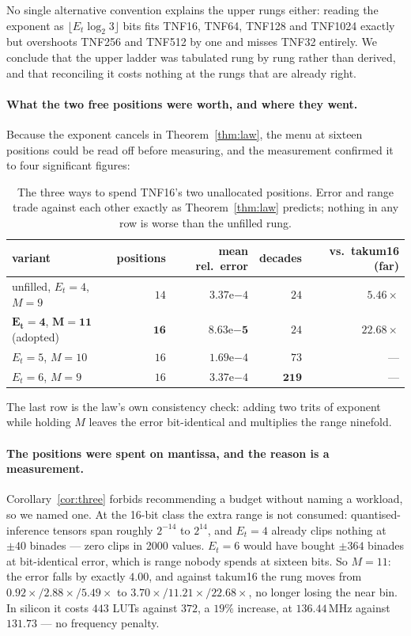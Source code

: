 \documentclass[11pt]{article}
\theoremstyle{definition}
\begin{document}
No single alternative convention explains the upper rungs either: reading the
exponent as $\lfloor E_t\log_2 3\rfloor$ bits fits TNF16, TNF64, TNF128 and
TNF1024 exactly but overshoots TNF256 and TNF512 by one and misses TNF32
entirely. We conclude that the upper ladder was tabulated rung by rung rather than
derived, and that reconciling it costs nothing at the rungs that are already
right.

\paragraph{What the two free positions were worth, and where they went.} Because
the exponent cancels in Theorem~\ref{thm:law}, the menu at sixteen positions could
be read off before measuring, and the measurement confirmed it to four significant
figures:

\begin{table}[t]\centering
\caption{The three ways to spend TNF16's two unallocated positions. Error and
range trade against each other exactly as Theorem~\ref{thm:law} predicts; nothing
in any row is worse than the unfilled rung.}
\label{tab:tnf16-fill}
\begin{tabular}{lrrrr}
\toprule
variant & positions & mean rel.\ error & decades & vs.\ takum16 (far) \\
\midrule
unfilled, $E_t{=}4$, $M{=}9$  & $14$ & $3.37\mathrm{e}{-4}$ & $24$  & $5.46\times$ \\
$\mathbf{E_t{=}4}$, $\mathbf{M{=}11}$ (adopted) & $\mathbf{16}$ & $\mathbf{8.63\mathrm{e}{-5}}$ & $24$ & $\mathbf{22.68\times}$ \\
$E_t{=}5$, $M{=}10$           & $16$ & $1.69\mathrm{e}{-4}$ & $73$  & --- \\
$E_t{=}6$, $M{=}9$            & $16$ & $3.37\mathrm{e}{-4}$ & $\mathbf{219}$ & --- \\
\bottomrule
\end{tabular}
\end{table}

The last row is the law's own consistency check: adding two trits of exponent
while holding $M$ leaves the error bit-identical and multiplies the range
ninefold.

\paragraph{The positions were spent on mantissa, and the reason is a measurement.}
Corollary~\ref{cor:three} forbids recommending a budget without naming a workload,
so we named one. At the 16-bit class the extra range is not consumed:
quantised-inference tensors span roughly $2^{-14}$ to $2^{14}$, and $E_t = 4$
already clips nothing at $\pm 40$ binades --- zero clips in 2000 values. $E_t = 6$
would have bought $\pm 364$ binades at bit-identical error, which is range nobody
spends at sixteen bits. So $M = 11$: the error falls by exactly $4.00$, and
against takum16 the rung moves from $0.92\times / 2.88\times / 5.49\times$ to
$3.70\times / 11.21\times / 22.68\times$, no longer losing the near bin. In
silicon it costs $443$ LUTs against $372$, a $19\%$ increase, at $136.44$\,MHz
against $131.73$ --- no frequency penalty.
\end{document}
